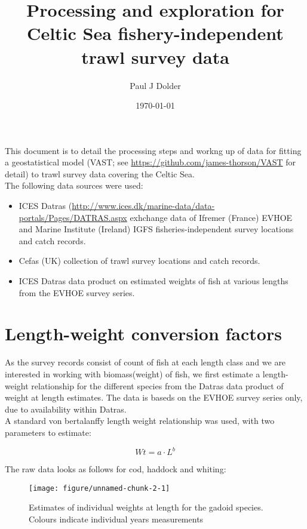 \documentclass[12pt]{article}\usepackage[]{graphicx}\usepackage[]{color}
\title{Processing and exploration for Celtic Sea fishery-independent trawl
	survey data}
\author{Paul J Dolder}
\date{\today}
\makeatletter
\def\maxwidth{ %
  \ifdim\Gin@nat@width>\linewidth
    \linewidth
  \else
    \Gin@nat@width
  \fi
}
\newenvironment{knitrout}{}{} %
\makeatother
\begin{document}
\maketitle

This document is to detail the processing steps and workng up of data for fitting
a geostatistical model (VAST; see \url{https://github.com/james-thorson/VAST}
for detail) to trawl survey data covering the Celtic Sea. \\

The following data sources were used:

\begin{itemize}
	\item ICES Datras
		(\url{http://www.ices.dk/marine-data/data-portals/Pages/DATRAS.aspx}
		exhchange data of Ifremer (France) EVHOE and Marine Institute
		(Ireland) IGFS fisheries-independent survey locations and catch
		records.
	\item Cefas (UK) collection of trawl survey locations and catch
		records.
	\item ICES Datras data product on estimated weights of fish at various
		lengths from the EVHOE survey series.
\end{itemize}

\section{Length-weight conversion factors}

As the survey records consist of count of fish at each length class and we are
interested in working with biomass(weight) of fish, we first estimate a
length-weight relationship for the different species from the Datras data
product of weight at length estimates. The data is baseds on the EVHOE survey
series only, due to availability within Datras. \\

A standard von bertalanffy length weight relationship was used, with two
parameters to estimate:

\begin{equation}\label{eq:1}
	Wt = a \cdot L^b
\end{equation}

The raw data looks as follows for cod, haddock and whiting:

\begin{knitrout}\footnotesize
{}\color{fgcolor}\begin{figure}
\texttt{[image: figure/unnamed-chunk-2-1]} \caption[Estimates of individual weights at length for the gadoid species]{Estimates of individual weights at length for the gadoid species. Colours indicate individual years measurements}\label{fig:unnamed-chunk-2}
\end{figure}


\end{knitrout}
\end{document}
